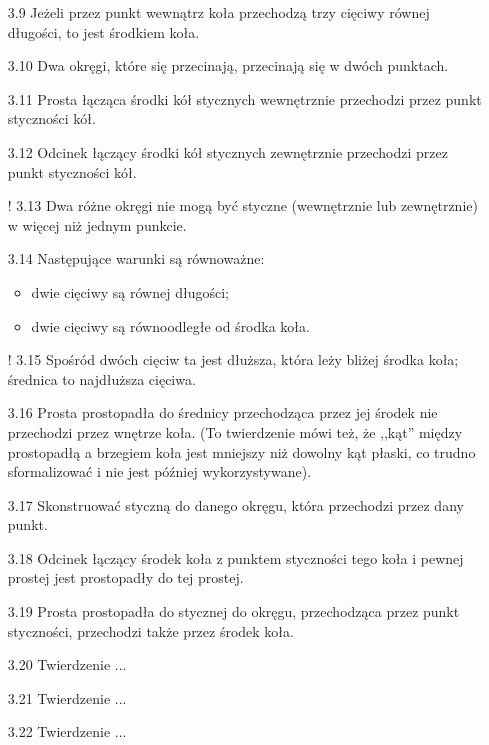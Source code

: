 \begin{enumerate}
    \item [3.9] Jeżeli przez punkt wewnątrz koła przechodzą trzy cięciwy równej długości, to jest środkiem koła.
    \item [3.10] Dwa okręgi, które się przecinają, przecinają się w dwóch punktach. 
    \item [3.11] Prosta łącząca środki kół stycznych wewnętrznie przechodzi przez punkt styczności kół.
    \item [3.12] Odcinek łączący środki kół stycznych zewnętrznie przechodzi przez punkt styczności kół.
    \item [! 3.13] Dwa różne okręgi nie mogą być styczne (wewnętrznie lub zewnętrznie) w więcej niż jednym punkcie.
    \item [3.14] Następujące warunki są równoważne:
        \begin{itemize}
        \item dwie cięciwy są równej długości; 
        \item dwie cięciwy są równoodległe od środka koła.
        \end{itemize}
    \item [! 3.15] Spośród dwóch cięciw ta jest dłuższa, która leży bliżej środka koła; średnica to najdłuższa cięciwa.
    \item [3.16] Prosta prostopadła do średnicy przechodząca przez jej środek nie przechodzi przez wnętrze koła. (To twierdzenie mówi też, że ,,kąt'' między prostopadłą a brzegiem koła jest mniejszy niż dowolny kąt płaski, co trudno sformalizować i nie jest później wykorzystywane).
    \item [3.17] Skonstruować styczną do danego okręgu, która przechodzi przez dany punkt.
    \item [3.18] Odcinek łączący środek koła z punktem styczności tego koła i pewnej prostej jest prostopadły do tej prostej.
    \item [3.19] Prosta prostopadła do stycznej do okręgu, przechodząca przez punkt styczności, przechodzi także przez środek koła.
    \item [3.20] Twierdzenie ...
    \item [3.21] Twierdzenie ...
    \item [3.22] Twierdzenie ...

\end{enumerate}

